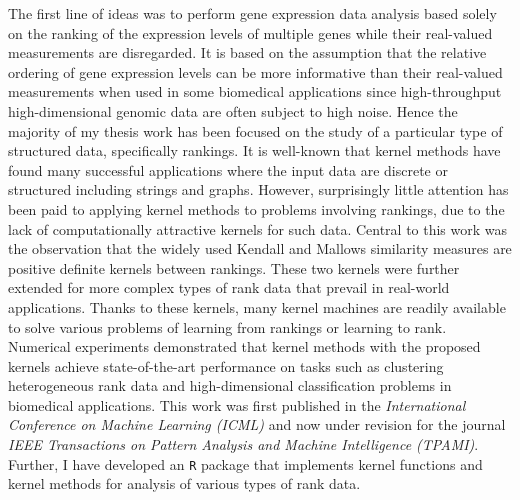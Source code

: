 The first line of ideas was to perform gene expression data analysis based solely on the ranking of the expression levels of multiple genes while their real-valued measurements are disregarded. It is based on the assumption that the relative ordering of gene expression levels can be more informative than their real-valued measurements when used in some biomedical applications since high-throughput high-dimensional genomic data are often subject to high noise. Hence the majority of my thesis work has been focused on the study of a particular type of structured data, specifically rankings. It is well-known that kernel methods have found many successful applications where the input data are discrete or structured including strings and graphs. However, surprisingly little attention has been paid to applying kernel methods to problems involving rankings, due to the lack of computationally attractive kernels for such data. Central to this work was the observation that the widely used Kendall and Mallows similarity measures are positive definite kernels between rankings. These two kernels were further extended for more complex types of rank data that prevail in real-world applications. Thanks to these kernels, many kernel machines are readily available to solve various problems of learning from rankings or learning to rank. Numerical experiments demonstrated that kernel methods with the proposed kernels achieve state-of-the-art performance on tasks such as clustering heterogeneous rank data and high-dimensional classification problems in biomedical applications. This work was first published in the \textit{International Conference on Machine Learning (ICML)} \cite{Jiao2015Kendall} and now under revision for the journal \textit{IEEE Transactions on Pattern Analysis and Machine Intelligence (TPAMI)}. Further, I have developed an \texttt{R} package that implements kernel functions and kernel methods for analysis of various types of rank data.

